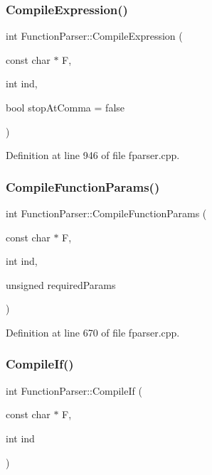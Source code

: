 \subsubsection{\texorpdfstring{Compile\+Expression()}{CompileExpression()}}
{\footnotesize\ttfamily int Function\+Parser\+::\+Compile\+Expression (\begin{DoxyParamCaption}\item[{const char $\ast$}]{F,  }\item[{int}]{ind,  }\item[{bool}]{stop\+At\+Comma = {\ttfamily false} }\end{DoxyParamCaption})\hspace{0.3cm}{\ttfamily [private]}}



Definition at line 946 of file fparser.\+cpp.

\mbox{\label{class_function_parser_a22e24efb5ef28aa34025bf49fe505010}} 
\subsubsection{\texorpdfstring{Compile\+Function\+Params()}{CompileFunctionParams()}}
{\footnotesize\ttfamily int Function\+Parser\+::\+Compile\+Function\+Params (\begin{DoxyParamCaption}\item[{const char $\ast$}]{F,  }\item[{int}]{ind,  }\item[{unsigned}]{required\+Params }\end{DoxyParamCaption})\hspace{0.3cm}{\ttfamily [private]}}



Definition at line 670 of file fparser.\+cpp.

\mbox{\label{class_function_parser_a9978dd583ee328a7f71a6075a3c5f97c}} 
\subsubsection{\texorpdfstring{Compile\+If()}{CompileIf()}}
{\footnotesize\ttfamily int Function\+Parser\+::\+Compile\+If (\begin{DoxyParamCaption}\item[{const char $\ast$}]{F,  }\item[{int}]{ind }\end{DoxyParamCaption})\hspace{0.3cm}{\ttfamily [private]}}



